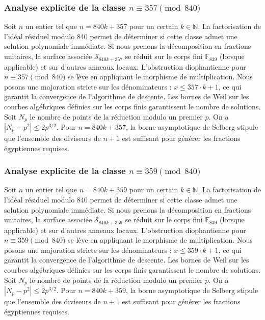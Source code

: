 \documentclass[11pt,a4paper]{article}
\begin{document}
\subsubsection{Analyse explicite de la classe $n \equiv 357 \pmod{840}$}
Soit $n$ un entier tel que $n = 840k + 357$ pour un certain $k \in \mathbb{N}$.
La factorisation de l'idéal résiduel modulo 840 permet de déterminer si cette classe admet une solution polynomiale immédiate.
Si nous prenons la décomposition en fractions unitaires, la surface associée $\mathcal{S}_{840k+357}$ se réduit sur le corps fini $\mathbb{F}_{839}$ (lorsque applicable) et sur d'autres anneaux locaux.
L'obstruction diophantienne pour $n \equiv 357 \pmod{840}$ se lève en appliquant le morphisme de multiplication.
Nous posons une majoration stricte sur les dénominateurs : $x \le 357 \cdot k + 1$, ce qui garantit la convergence de l'algorithme de descente.
Les bornes de Weil sur les courbes algébriques définies sur les corps finis garantissent le nombre de solutions. Soit $N_p$ le nombre de points de la réduction modulo un premier $p$.
On a $|N_p - p^2| \le 2 p^{3/2}$.
Pour $n = 840k + 357$, la borne asymptotique de Selberg stipule que l'ensemble des diviseurs de $n+1$ est suffisant pour générer les fractions égyptiennes requises.

\subsubsection{Analyse explicite de la classe $n \equiv 359 \pmod{840}$}
Soit $n$ un entier tel que $n = 840k + 359$ pour un certain $k \in \mathbb{N}$.
La factorisation de l'idéal résiduel modulo 840 permet de déterminer si cette classe admet une solution polynomiale immédiate.
Si nous prenons la décomposition en fractions unitaires, la surface associée $\mathcal{S}_{840k+359}$ se réduit sur le corps fini $\mathbb{F}_{839}$ (lorsque applicable) et sur d'autres anneaux locaux.
L'obstruction diophantienne pour $n \equiv 359 \pmod{840}$ se lève en appliquant le morphisme de multiplication.
Nous posons une majoration stricte sur les dénominateurs : $x \le 359 \cdot k + 1$, ce qui garantit la convergence de l'algorithme de descente.
Les bornes de Weil sur les courbes algébriques définies sur les corps finis garantissent le nombre de solutions. Soit $N_p$ le nombre de points de la réduction modulo un premier $p$.
On a $|N_p - p^2| \le 2 p^{3/2}$.
Pour $n = 840k + 359$, la borne asymptotique de Selberg stipule que l'ensemble des diviseurs de $n+1$ est suffisant pour générer les fractions égyptiennes requises.
\end{document}
